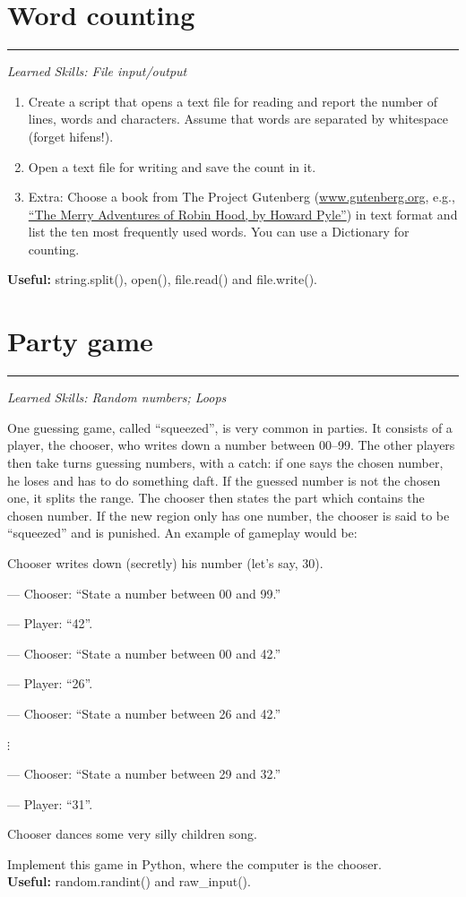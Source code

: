 \documentclass[smallheadings,12pt]{scrartcl}
\newcommand{\skills}[1]{\rule{1cm}{0pt}{\begin{minipage}{.8\textwidth}\small\em
      Learned Skills:  #1\end{minipage}}}
\newenvironment{packed_item}{
\begin{itemize}
  \setlength{\itemsep}{1pt}
  \setlength{\parskip}{0pt}
  \setlength{\parsep}{0pt}
}{\end{itemize}}
\begin{document}
\section{Word counting}
\skills{File input/output}
\begin{enumerate}
\item Create a script that opens a text file for reading and report the number of lines,
 words and characters. Assume that words are separated by whitespace (forget hifens!).
\item Open a text file for writing and save the count in it.
\item Extra: Choose a book from The Project Gutenberg
 (\url{www.gutenberg.org}, e.g., \href{http://www.gutenberg.org/cache/epub/964/pg964.txt}{``The Merry Adventures of Robin Hood, by Howard Pyle''}) in
 text format and list the ten most frequently used words. You can use a Dictionary for counting.
\end{enumerate}
\textbf{Useful:} string.split(), open(), file.read() and file.write().

\section{Party game}
\skills{Random numbers; Loops}

One guessing game, called ``squeezed'', is very common in
parties. It consists of a player, the chooser,
who writes down a number between 00--99. The other players then take
turns guessing numbers, with a catch: if one says the chosen number,
he loses and has to do something daft. If the guessed number is not the chosen
one, it splits the range. The chooser then states the part which contains
the chosen number. If the new region only has one number, the
chooser is said to be ``squeezed'' and is punished. An example of gameplay would be:
\begin{packed_item}
	\item Chooser writes down (secretly) his number (let's say, 30).
	\item[---] Chooser: ``State a number between 00 and 99.'' 
	\item[---] Player: ``42''.
	\item[---] Chooser: ``State a number between 00 and 42.''
	\item[---] Player: ``26''.
	\item[---] Chooser: ``State a number between 26 and 42.''
	\item[] \hspace{3cm} $\vdots$
	\item[---] Chooser: ``State a number between 29 and 32.''	
	\item[---] Player: ``31''.
	\item Chooser dances some very silly children song.
\end{packed_item}
Implement this game in Python, where the computer is the chooser.\\[2pt]
\textbf{Useful:} random.randint() and raw\_input().
\end{document}

